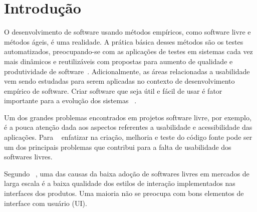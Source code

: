 \chapter{Introdução}

O desenvolvimento de software usando métodos empíricos, como software livre e métodos ágeis, é uma realidade. A prática básica desses métodos são os testes automatizados, preocupando-se com as aplicações de testes em sistemas cada vez mais dinâmicos e reutilizáveis com propostas para aumento de qualidade e produtividade de software~\cite{vicente2010}.
%
Adicionalmente, as áreas relacionadas a usabilidade vem sendo estudadas para serem aplicadas no contexto de desenvolvimento empírico de software. Criar software que seja útil e fácil de usar é fator importante para a evolução dos sistemas ~\cite{santos2012}.

Um dos grandes problemas encontrados em projetos software livre, por exemplo, é a pouca atenção dada aos aspectos referentes a usabilidade e acessibilidade das aplicações. Para ~ enfatizar na criação, melhoria e teste do código fonte pode ser um dos principais problemas que contribui para a falta de usabilidade dos softwares livres.

%
Segundo ~, uma das causas da baixa adoção de softwares livres em mercados de larga escala é a baixa qualidade dos estilos de interação implementados nas interfaces dos produtos. Uma maioria não se preocupa com bons elementos de interface com usuário (UI). 

